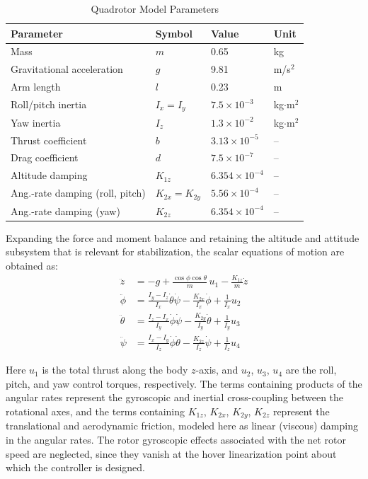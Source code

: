 \documentclass[conference]{IEEEtran}
\begin{document}
\begin{table}[!t]
\renewcommand{\arraystretch}{1.3}
\caption{Quadrotor Model Parameters}
\label{tab:params}
\centering
\begin{tabular}{llll}
\toprule
\textbf{Parameter} & \textbf{Symbol} & \textbf{Value} & \textbf{Unit}\\
\midrule
Mass & $m$ & 0.65 & kg\\
Gravitational acceleration & $g$ & 9.81 & m/s$^2$\\
Arm length & $l$ & 0.23 & m\\
Roll/pitch inertia & $I_x=I_y$ & $7.5\times10^{-3}$ & kg$\cdot$m$^2$\\
Yaw inertia & $I_z$ & $1.3\times10^{-2}$ & kg$\cdot$m$^2$\\
Thrust coefficient & $b$ & $3.13\times10^{-5}$ & --\\
Drag coefficient & $d$ & $7.5\times10^{-7}$ & --\\
Altitude damping & $K_{1z}$ & $6.354\times10^{-4}$ & --\\
Ang.-rate damping (roll, pitch) & $K_{2x}\!=\!K_{2y}$ & $5.56\times10^{-4}$ & --\\
Ang.-rate damping (yaw) & $K_{2z}$ & $6.354\times10^{-4}$ & --\\
\bottomrule
\end{tabular}
\end{table}

Expanding the force and moment balance and retaining the altitude and attitude subsystem that is relevant for stabilization, the scalar equations of motion are obtained as:
\begin{align}
\ddot{z} &= -g + \frac{\cos\phi\cos\theta}{m}\,u_1 - \frac{K_{1z}}{m}\dot{z}\\[2pt]
\ddot{\phi} &= \frac{I_y - I_z}{I_x}\dot{\theta}\dot{\psi} - \frac{K_{2x}}{I_x}\dot{\phi} + \frac{1}{I_x}u_2\\[2pt]
\ddot{\theta} &= \frac{I_z - I_x}{I_y}\dot{\phi}\dot{\psi} - \frac{K_{2y}}{I_y}\dot{\theta} + \frac{1}{I_y}u_3\\[2pt]
\ddot{\psi} &= \frac{I_x - I_y}{I_z}\dot{\phi}\dot{\theta} - \frac{K_{2z}}{I_z}\dot{\psi} + \frac{1}{I_z}u_4
\end{align}

Here $u_1$ is the total thrust along the body $z$-axis, and $u_2$, $u_3$, $u_4$ are the roll, pitch, and yaw control torques, respectively. The terms containing products of the angular rates represent the gyroscopic and inertial cross-coupling between the rotational axes, and the terms containing $K_{1z}$, $K_{2x}$, $K_{2y}$, $K_{2z}$ represent the translational and aerodynamic friction, modeled here as linear (viscous) damping in the angular rates. The rotor gyroscopic effects associated with the net rotor speed are neglected, since they vanish at the hover linearization point about which the controller is designed.
\end{document}
